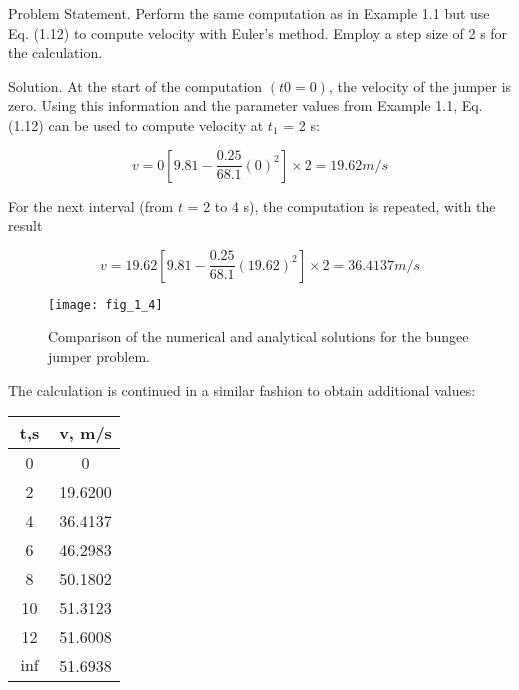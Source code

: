 \documentclass[../main.tex]{subfiles}
\begin{document}
Problem Statement. Perform the same computation as in Example 1.1 but use Eq. (1.12)
to compute velocity with Euler's method. Employ a step size of 2 s for the calculation.

Solution. At the start of the computation $(t0 = 0)$, the velocity of the jumper is zero.
Using this information and the parameter values from Example 1.1, Eq. (1.12) can be used
to compute velocity at $t_1$ = 2 s:

$$ v= 0 \left[ 9.81 - \dfrac{0.25}{68.1}(0)^2 \right] \times 2 = 19.62 m/s$$ 

For the next interval (from $t$ = 2 to 4 s), the computation is repeated, with the result

$$ v= 19.62 \left[ 9.81 - \dfrac{0.25}{68.1}(19.62)^2 \right] \times 2 = 36.4137 m/s$$ 

\begin{figure}[H]
	\centering
	\texttt{[image: fig\_1\_4]}
   \caption{\textsf{Comparison of the numerical and analytical solutions for the bungee jumper problem.}}
  
\end{figure}


The calculation is continued in a similar fashion to obtain additional values:


\begin{table}[H]
	\begin{tabular}{c c}
		\hline
		\textbf{t,s} & \textbf{v, m/s} \\ 
		\hline
			0 &0\\
			2 &19.6200\\
			4 &36.4137\\
			6& 46.2983\\
			8 &50.1802\\
			10 & 51.3123\\
			12& 51.6008\\
			$\inf$ &51.6938 \\
			\hline
		
	\end{tabular}
\end{table}
\end{document}
